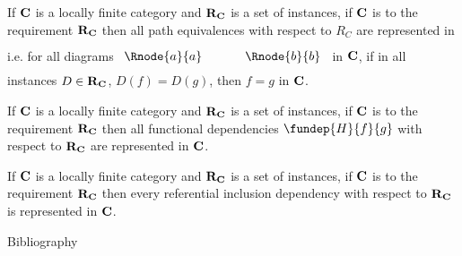 \documentclass[xcolor=pst,dvips]{beamer}   %
\begin{document}
\begin{frame}
\begin{lemma}
If $\textbf{C}$ is a locally finite category and $\textbf{R}_{\textbf{C}}$ is a set of instances, if $\textbf{C}$ is 
 to the requirement $\textbf{R}_{\textbf{C}}$ then all path equivalences with respect
to $R_C$ are represented in \catcw
i.e. for all diagrams
$
\rule[-0.3cm]{0pt}{0.9cm} %
\begin{array}{c p{0.5cm} c  }
 \Rnode{a}{a}            &&   \Rnode{b}{b}
\end{array} 
$
in $\textbf{C}$,  if in all instances $D \in \textbf{R}_{\textbf{C}}$, $D(f)=D(g)$, 
then $f=g$ in $\textbf{C}$.
\end{lemma}
\end{frame}


\begin{frame}
\begin{lemma}
If $\textbf{C}$ is a locally finite category and $\textbf{R}_{\textbf{C}}$ is a set of instances, if $\textbf{C}$ is 
 to the requirement $\textbf{R}_{\textbf{C}}$ then
all functional dependencies $\fundep{H}{f}{g}$  with respect to $\textbf{R}_{\textbf{C}}$ are represented in $\textbf{C}$.
\end{lemma}
\end{frame}

\begin{frame}
\begin{lemma}
If $\textbf{C}$ is a locally finite category and $\textbf{R}_{\textbf{C}}$ is a set of instances, if $\textbf{C}$ is 
 to the requirement $\textbf{R}_{\textbf{C}}$ then
every referential inclusion dependency with respect to $\textbf{R}_{\textbf{C}}$ is represented in $\textbf{C}$.
\end{lemma}
\end{frame}

\begin{frame}{Bibliography}

\end{frame}

\end{document}
